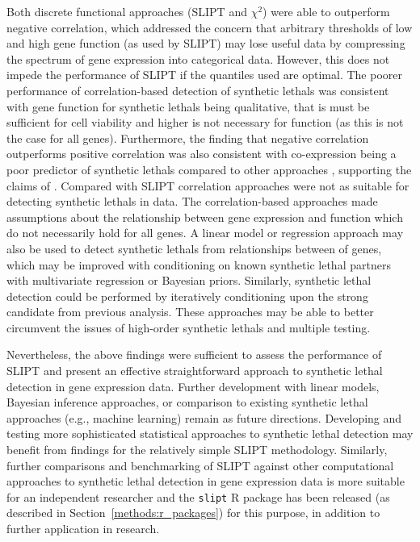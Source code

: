 Both discrete functional approaches (\gls{SLIPT} and $\chi^2$) were able to outperform negative correlation, which addressed the concern that arbitrary thresholds of low and high gene function (as used by \gls{SLIPT}) may lose useful data by compressing the spectrum of \gls{gene expression} into categorical data. However, this does not impede the performance of \gls{SLIPT} if the quantiles used \textcolor{black}{are} optimal. The poorer performance of correlation-based detection of \glspl{synthetic lethal} was consistent with gene function for \glspl{synthetic lethal} being qualitative, that is  must be sufficient for cell viability and higher  \textcolor{black}{is} not necessary for function (as this is not the case for all genes). Furthermore, the finding that negative correlation outperforms positive correlation was also consistent with co-expression being a poor predictor of \glspl{synthetic lethal} compared to other approaches \citep{Jerby2014}, supporting the claims of \citet{Lu2015}.
%
Compared with \gls{SLIPT} correlation approaches were not as suitable for detecting \glspl{synthetic lethal} in  data. The correlation-based approaches made assumptions about the relationship between \gls{gene expression} and function which do not necessarily hold for all genes. %
A linear model or regression approach may also be used to detect \glspl{synthetic lethal} from relationships between  of genes, which 
may be improved with conditioning on known \gls{synthetic lethal} partners with multivariate regression or Bayesian priors. Similarly, \gls{synthetic lethal} detection could be performed by iteratively conditioning upon the strong candidate from previous analysis. These approaches may be able to better circumvent the issues of high-order \glspl{synthetic lethal} and multiple testing. 

Nevertheless, the above findings were sufficient to assess the performance of \gls{SLIPT} and present an effective straightforward approach to \gls{synthetic lethal} detection in \gls{gene expression} data. Further development with linear models, Bayesian inference approaches, or comparison to existing \gls{synthetic lethal} approaches (e.g., machine learning) remain as future directions. Developing and testing more sophisticated statistical approaches to \gls{synthetic lethal} detection may benefit from findings for the relatively simple \gls{SLIPT} methodology. Similarly, further comparisons and benchmarking of \gls{SLIPT} against other computational approaches to \gls{synthetic lethal} detection in \gls{gene expression} data is more suitable for an independent researcher and the \texttt{slipt} R package has been released (as described in Section~\ref{methods:r_packages}) for this purpose, in addition to further application in research.

